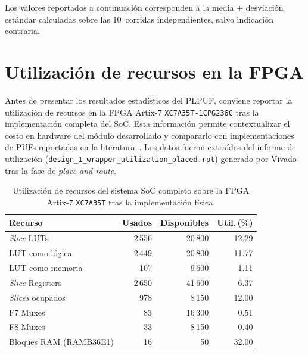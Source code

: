 Los valores reportados a continuación corresponden a la media $\pm$
desviación estándar calculadas sobre las 10~corridas independientes, salvo
indicación contraria.

\section{Utilización de recursos en la FPGA}
\label{sec:res_recursos}

Antes de presentar los resultados estadísticos del PLPUF, conviene reportar
la utilización de recursos en la FPGA Artix-7 \texttt{XC7A35T-1CPG236C} tras
la implementación completa del SoC. Esta información permite contextualizar
el costo en hardware del módulo desarrollado y compararlo con
implementaciones de PUFs reportadas en la
literatura~\cite{lata_2023_fpgapuf, anandakumar_2021_fpgapufs}. Los datos
fueron extraídos del informe de utilización
(\texttt{design\_1\_wrapper\_utilization\_placed.rpt}) generado por Vivado
tras la fase de \textit{place and route}.

\begin{table}[htbp]
\centering
\caption{Utilización de recursos del sistema SoC completo sobre la FPGA
  Artix-7 \texttt{XC7A35T} tras la implementación física.}
\label{tab:utilizacion_global}
\small
\renewcommand{\arraystretch}{1.2}
\begin{tabular}{lrrr}
\hline
\textbf{Recurso} & \textbf{Usados} & \textbf{Disponibles} & \textbf{Util.\,(\%)} \\
\hline
\textit{Slice} LUTs                & 2\,556 & 20\,800 & 12.29 \\
\quad LUT como lógica              & 2\,449 & 20\,800 & 11.77 \\
\quad LUT como memoria             & 107    & 9\,600  & 1.11  \\
\textit{Slice} Registers           & 2\,650 & 41\,600 & 6.37  \\
\textit{Slices} ocupados           & 978    & 8\,150  & 12.00 \\
F7 Muxes                           & 83     & 16\,300 & 0.51  \\
F8 Muxes                           & 33     & 8\,150  & 0.40  \\
Bloques RAM (RAMB36E1)             & 16     & 50      & 32.00 \\
\hline
\end{tabular}
\end{table}

